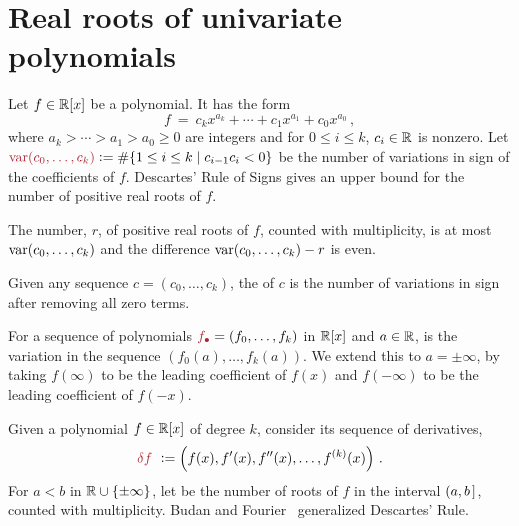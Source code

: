 
\section{Real roots of univariate polynomials}\label{S:one}

Let $f\in\mathbb{R}[x]$ be a polynomial.
It has the form
%
 \[
   f\ =\ c_kx^{a_k}  + \dotsb + c_{1}x^{a_{1}} + c_0x^{a_0}\,,
 \]
%
where $a_k> \dotsb > a_1 > a_0 \geq 0$ are integers and for $0\leq i \leq k$, $c_{i}\in\mathbb{R}$ is nonzero.
Let $\defcolor{\var(c_0,\dotsc,c_k)}\vcentcolon=\#\{1\leq i\leq k\mid c_{i-1}c_i<0\}$ be the number of variations in sign of the
coefficients of $f$.
Descartes' Rule of Signs \cite{So_Book} gives an upper bound for the number of positive real roots of $f$.

\begin{theorem}
  The number, $r$,  of positive real roots of $f$, counted with multiplicity, is at most $\operatorname{{\rm var}}(c_0,\dotsc,c_k)$ and the difference
  $\operatorname{{\rm var}}(c_0,\dotsc,c_k)-r$ is even.
\end{theorem}

Given any sequence $c=(c_0,\dotsc,c_k)$, the    of $c$ is the
number of variations in sign after removing all zero terms.
%
\begin{leftbar}

\end{leftbar}
%
For a sequence of polynomials  $\defcolor{f_\bullet}=(f_0,\dotsc,f_k)$ in $\mathbb{R}[x]$ and $a\in\mathbb{R}$,  is the
variation in the sequence 
$(f_0(a),\dotsc,f_{k}(a))$. 
We extend this to $a=\pm\infty$, by taking $f(\infty)$ to be the leading coefficient of $f(x)$ and $f(-\infty)$ to be the leading
coefficient of $f(-x)$.

Given a polynomial $f\in\mathbb{R}[x]$ of degree $k$, consider its sequence of derivatives,
%
 \[
   \defcolor{\delta f}\ \vcentcolon= \left(f(x),f'(x),f''(x),\dots,f^{(k)}(x)\right)\,.
 \]
%
For $a<b$ in $\mathbb{R}\cup\{\pm \infty\}$, let  be the number of roots of $f$ in the interval $(a,b\hspace{.05cm}]$, counted
with multiplicity.
Budan and Fourier~\cite[Ch.\ 2]{So_Book} generalized Descartes' Rule.

